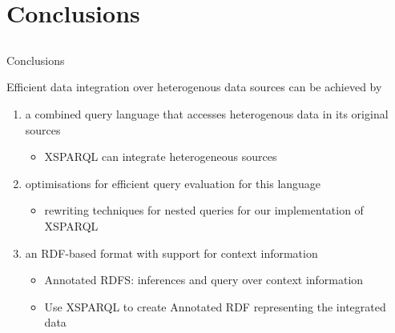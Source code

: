 

\section{Conclusions}

\subsection{}


\begin{frame}{Conclusions}


  \begin{block}{}
    Efficient data integration over heterogenous data sources can be achieved by
    \begin{enumerate}
    \item<2-> a combined query language that accesses heterogenous data in its original sources
      \begin{itemize}
      \item<3-| alert@3> XSPARQL can integrate heterogeneous sources
      \end{itemize}
    \item<2-> optimisations for efficient query evaluation for this language
      \begin{itemize}
      \item<4-| alert@4> rewriting techniques for nested queries for our implementation of XSPARQL
      \end{itemize}
    \item<2-> an RDF-based format with support for context information
      \begin{itemize}
      \item<5-| alert@5> Annotated RDFS: inferences and query over context information 
      \item<5-| alert@5> Use XSPARQL to create Annotated RDF representing the integrated data
      \end{itemize}
    \end{enumerate}
  \end{block}
  

\end{frame}

